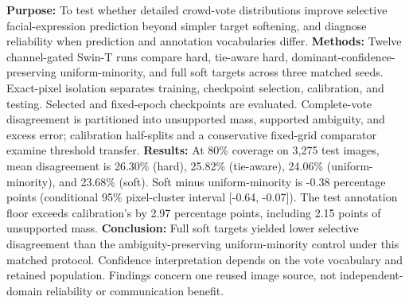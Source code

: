 \textbf{Purpose:} To test whether detailed crowd-vote distributions improve selective facial-expression prediction beyond simpler target softening, and diagnose reliability when prediction and annotation vocabularies differ. \textbf{Methods:} Twelve channel-gated Swin-T runs compare hard, tie-aware hard, dominant-confidence-preserving uniform-minority, and full soft targets across three matched seeds. Exact-pixel isolation separates training, checkpoint selection, calibration, and testing. Selected and fixed-epoch checkpoints are evaluated. Complete-vote disagreement is partitioned into unsupported mass, supported ambiguity, and excess error; calibration half-splits and a conservative fixed-grid comparator examine threshold transfer. \textbf{Results:} At 80\% coverage on 3,275 test images, mean disagreement is 26.30\% (hard), 25.82\% (tie-aware), 24.06\% (uniform-minority), and 23.68\% (soft). Soft minus uniform-minority is -0.38 percentage points (conditional 95\% pixel-cluster interval [-0.64, -0.07]). The test annotation floor exceeds calibration's by 2.97 percentage points, including 2.15 points of unsupported mass. \textbf{Conclusion:} Full soft targets yielded lower selective disagreement than the ambiguity-preserving uniform-minority control under this matched protocol. Confidence interpretation depends on the vote vocabulary and retained population. Findings concern one reused image source, not independent-domain reliability or communication benefit.
